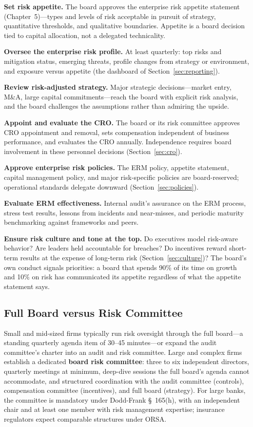 \documentclass[11pt,openany]{book}
\begin{document}
\textbf{Set risk appetite.} The board approves the enterprise risk appetite
statement (Chapter~5)---types and levels of risk acceptable in pursuit of
strategy, quantitative thresholds, and qualitative boundaries. Appetite is a
board decision tied to capital allocation, not a delegated technicality.

\textbf{Oversee the enterprise risk profile.} At least quarterly: top risks
and mitigation status, emerging threats, profile changes from strategy or
environment, and exposure versus appetite (the dashboard of
Section~\ref{sec:reporting}).

\textbf{Review risk-adjusted strategy.} Major strategic decisions---market
entry, M\&A, large capital commitments---reach the board with explicit risk
analysis, and the board challenges the assumptions rather than admiring the
upside.

\textbf{Appoint and evaluate the CRO.} The board or its risk committee
approves CRO appointment and removal, sets compensation independent of
business performance, and evaluates the CRO annually. Independence requires
board involvement in these personnel decisions (Section~\ref{sec:cro}).

\textbf{Approve enterprise risk policies.} The ERM policy, appetite
statement, capital management policy, and major risk-specific policies are
board-reserved; operational standards delegate downward
(Section~\ref{sec:policies}).

\textbf{Evaluate ERM effectiveness.} Internal audit's assurance on the ERM
process, stress test results, lessons from incidents and near-misses, and
periodic maturity benchmarking against frameworks and peers.

\textbf{Ensure risk culture and tone at the top.} Do executives model
risk-aware behavior? Are leaders held accountable for breaches? Do incentives
reward short-term results at the expense of long-term risk
(Section~\ref{sec:culture})? The board's own conduct signals priorities: a
board that spends 90\% of its time on growth and 10\% on risk has
communicated its appetite regardless of what the appetite statement says.

\subsection{Full Board versus Risk Committee}

Small and mid-sized firms typically run risk oversight through the full
board---a standing quarterly agenda item of 30--45 minutes---or expand the
audit committee's charter into an audit and risk committee. Large and complex
firms establish a dedicated \textbf{board risk committee}: three to six
independent directors, quarterly meetings at minimum, deep-dive sessions the
full board's agenda cannot accommodate, and structured coordination with the
audit committee (controls), compensation committee (incentives), and full
board (strategy). For large banks, the committee is mandatory under
Dodd-Frank \S~165(h), with an independent chair and at least one member with
risk management expertise; insurance regulators expect comparable structures
under ORSA.
\end{document}
